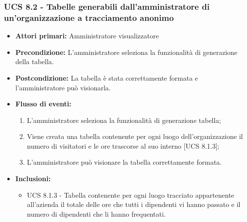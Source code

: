 \subsubsection{UCS 8.2 - Tabelle generabili dall'amministratore di un'organizzazione a tracciamento anonimo}%
\begin{itemize}
\item \textbf{Attori primari:} Amministratore visualizzatore
\item \textbf{Precondizione:} L'amministratore seleziona la funzionalità di generazione della tabella.
\item \textbf{Postcondizione:} La tabella è stata correttamente formata e l'amministratore può visionarla.
\item \textbf{Flusso di eventi:}
	\begin{enumerate}%
	\item L'amministratore seleziona la funzionalità di generazione tabella;
	\item Viene creata una tabella contenente per ogni luogo dell'organizzazione il numero di visitatori e le ore trascorse al suo interno [UCS 8.1.3];
	\item L'amministratore può visionare la tabella correttamente formata.
\end{enumerate}
\item \textbf{Inclusioni:} 
\begin{itemize}
		\item UCS 8.1.3 - Tabella contenente per ogni luogo tracciato appartenente all'azienda il totale delle ore che tutti i dipendenti vi hanno passato e il numero di dipendenti che li hanno frequentati.
	\end{itemize}
\end{itemize}
